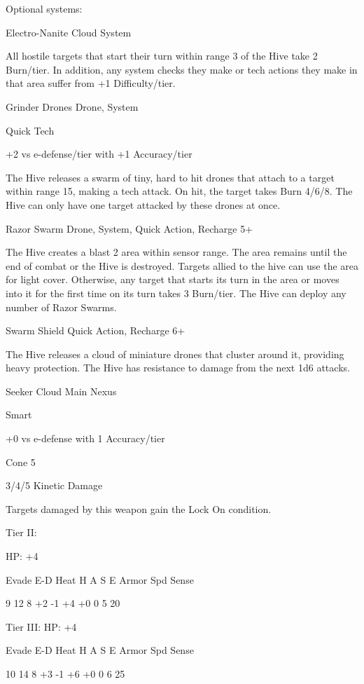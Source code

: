 Optional systems:
 
Electro-Nanite Cloud  
System
 

                                                                                                          


All hostile targets that start their turn within range 3 of the Hive take 2 Burn/tier. In addition, any  
system checks they make or tech actions they make in that area suffer from +1 Difficulty/tier.
 

Grinder Drones  
Drone, System
 
Quick Tech
 
+2 vs e-defense/tier with +1 Accuracy/tier
 
The Hive releases a swarm of tiny, hard to hit drones that attach to a target within range 15,  
making a tech attack. On hit, the target takes Burn 4/6/8. The Hive can only have one target  
attacked by these drones at once.
 

Razor Swarm  
Drone, System, Quick Action, Recharge 5+
 
The Hive creates a blast 2 area within sensor range. The area remains until the end of combat or  
the Hive is destroyed. Targets allied to the hive can use the area for light cover. Otherwise, any  
target that starts its turn in the area or moves into it for the first time on its turn takes 3 Burn/tier.  
The Hive can deploy any number of Razor Swarms.
 

Swarm Shield  
Quick Action, Recharge 6+
 
The Hive releases a cloud of miniature drones that cluster around it, providing heavy protection.  
The Hive has resistance to damage from the next 1d6 attacks.
 

Seeker Cloud  
Main Nexus
 
Smart
 
+0 vs e-defense with 1 Accuracy/tier
 
Cone 5
 
3/4/5 Kinetic Damage
 
Targets damaged by this weapon gain the Lock On condition.
 

Tier II:
 
HP: +4
 

          Evade    E-D    Heat    H    A     S    E       Armor        Spd      Sense 

         9         12     8       +2   -1    +4   +0       0           5        20 

Tier III:  
HP: +4
 

          Evade    E-D    Heat    H    A     S    E       Armor        Spd      Sense 

          10       14     8       +3   -1    +6   +0       0           6        25 
